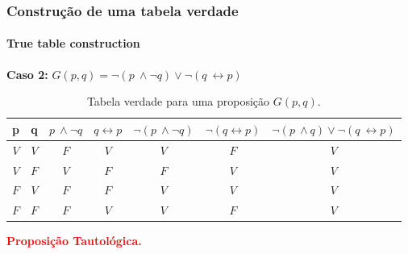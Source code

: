 \begin{frame}[t]
    \frametitle{Construção de uma tabela verdade}
    \framesubtitle{True table construction}
    \begin{exampleblock}{}
        \textbf{Caso 2:} $G(p,q) = \lnot (p~\land \lnot q) \lor \lnot (q~\leftrightarrow p)$
    \end{exampleblock}
    \begin{table}[ht]
        \footnotesize
        \caption{Tabela verdade para uma proposição $G(p,q)$.}
        \label{tab:tabela-caso-2}
        \begin{tabular}{|c|c|c|c|c|c|c|}
            \hline
            \rowcolor[HTML]{EFEFEF} 
            \textbf{p} &
            \textbf{q} &
            \textbf{$p~\land \lnot q$} &
            \textbf{$q \leftrightarrow p$} &
            \textbf{$\lnot (p~\land \lnot q)$} &
            \textbf{$\lnot (q \leftrightarrow p)$} &
            \textbf{$\lnot (p~\land q) \lor \lnot (q~\leftrightarrow p)$} \\ \hline
            $V$ & $V$ & $F$ & $V$ & $V$ & $F$ & $V$ \\ \hline
            $V$ & $F$ & $V$ & $F$ & $F$ & $V$ & $V$ \\ \hline
            $F$ & $V$ & $F$ & $F$ & $V$ & $V$ & $V$ \\ \hline
            $F$ & $F$ & $F$ & $V$ & $V$ & $F$ & $V$ \\ \hline
        \end{tabular}
    \end{table}
    \begin{center}
        \textbf{\textcolor{red}{Proposição Tautológica.}}    
    \end{center}
\end{frame}
%

